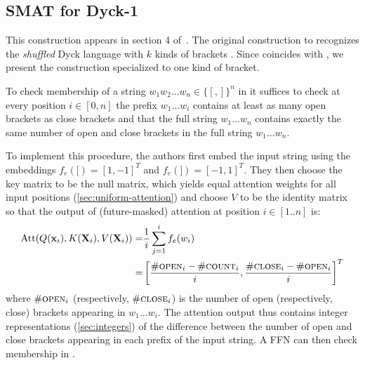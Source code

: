 \subsection{SMAT for Dyck-1}
This construction appears in section 4 of~\citet{bhattamishra2020ability}. The original construction to recognizes the \textit{shuffled} Dyck language with $k$ kinds of brackets . Since  coincides with , we present the construction specialized to one kind of bracket.

 To check membership of a string $w_1w_2\ldots w_{n} \in \{[,] \}^n$ in  it suffices to check at every position $i \in [0,n]$ the prefix $w_1 \ldots w_i$ contains at least as many open brackets as close brackets and that the full string $w_1 \ldots w_n$ contains exactly the same number of open and close brackets in the full string $w_1\ldots w_n$.

  To implement this procedure, the authors first embed the input string using the embeddings $f_e([) = [1,-1]^T$ and $f_e(]) = [-1,1]^T$. They then choose the key matrix to be the null matrix, which yields equal attention weights for all input positions (\cref{sec:uniform-attention}) and choose $V$ to be the identity matrix so that the output of (future-masked) attention at position $i \in [1..n]$ is:\begin{align*}
    \mathrm{Att}(Q(\mathbf{x}_i), K(\mathbf{X}_i), V(\mathbf{X}_i)) = & \frac{1}{i}\sum_{j=1}^i f_e(w_i)\\
    = & \left[ \frac{{\#}\textsc{open}_i - {\#}\textsc{count}_i}{i}, \frac{{\#}\textsc{close}_i - {\#}\textsc{open}_i}{i}\right]^T
\end{align*}
where ${\#}\textsc{open}_i$ (respectively, ${\#}\textsc{close}_i$) is the number of open (respectively, close) brackets appearing in $w_1\ldots w_i$. The attention output thus contains integer representations (\cref{sec:integers}) of the difference between the number of open and close brackets appearing in each prefix of the input string. A FFN can then check membership in .

